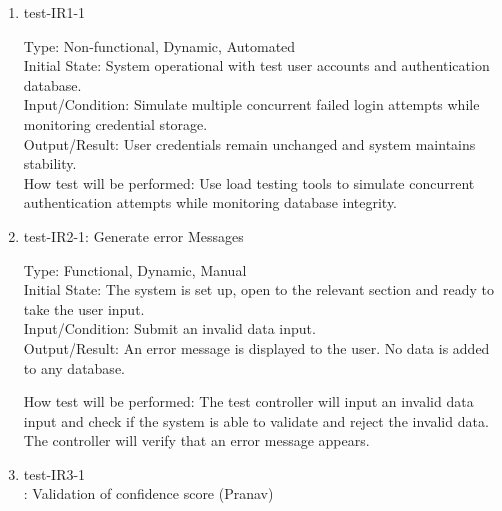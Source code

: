 \documentclass[12pt, titlepage]{article}
\begin{document}
\begin{enumerate}
    \item{test-IR1-1\\}  \label{test-IR1-1}
    
    Type: Non-functional, Dynamic, Automated\\
    
    Initial State: System operational with test user accounts and authentication database.\\
    
    Input/Condition: Simulate multiple concurrent failed login attempts while monitoring credential storage.\\
    
    Output/Result: User credentials remain unchanged and system maintains stability.\\
    
    How test will be performed: Use load testing tools to simulate concurrent authentication attempts while monitoring database integrity.


    \item{test-IR2-1}: Generate error Messages \label{test-IR2-1}
    
    Type: Functional, Dynamic, Manual\\
    
    Initial State: The system is set up, open to the relevant section and ready to take the user input.\\
    
    Input/Condition: Submit an invalid data input.\\
    
    Output/Result: An error message is displayed to the user. No data is added to any database. 
    
    How test will be performed: The test controller will input an invalid data input and check if the system is able to validate and reject the invalid data. The controller will verify that an error message appears.


    \item{test-IR3-1\\}: Validation of confidence score (Pranav) \label{test-IR3-1}
    
    
    
    

\end{enumerate}
\end{document}
